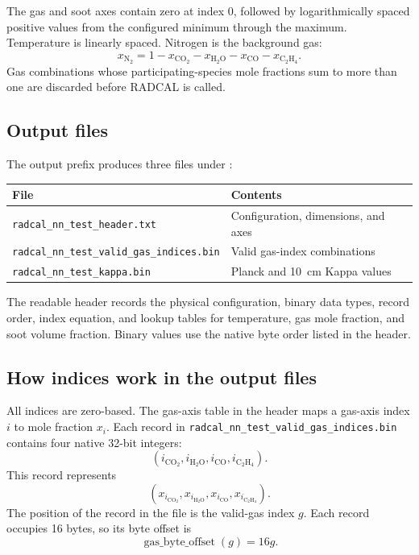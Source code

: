 \documentclass[11pt]{article}
\begin{document}
The gas and soot axes contain zero at index 0, followed by logarithmically
spaced positive values from the configured minimum through the maximum.
Temperature is linearly spaced. Nitrogen is the background gas:
\[
x_{\mathrm{N_2}} =
1-x_{\mathrm{CO_2}}-x_{\mathrm{H_2O}}-x_{\mathrm{CO}}-x_{\mathrm{C_2H_4}}.
\]
Gas combinations whose participating-species mole fractions sum to more than
one are discarded before RADCAL is called.

\subsection{Output files}

The output prefix produces three files under
:

\begin{center}
\begin{tabular}{ll}
\toprule
File & Contents \\
\midrule
\texttt{radcal\_nn\_test\_header.txt} & Configuration, dimensions, and axes \\
\texttt{radcal\_nn\_test\_valid\_gas\_indices.bin} & Valid gas-index combinations \\
\texttt{radcal\_nn\_test\_kappa.bin} & Planck and 10~cm Kappa values \\
\bottomrule
\end{tabular}
\end{center}

The readable header records the physical configuration, binary data types,
record order, index equation, and lookup tables for temperature, gas mole
fraction, and soot volume fraction. Binary values use the native byte order
listed in the header.

\subsection{How indices work in the output files}

All indices are zero-based. The gas-axis table in the header maps a gas-axis
index \(i\) to mole fraction \(x_i\). Each record in
\texttt{radcal\_nn\_test\_valid\_gas\_indices.bin} contains four native
32-bit integers:
\[
(i_{\mathrm{CO_2}},i_{\mathrm{H_2O}},i_{\mathrm{CO}},i_{\mathrm{C_2H_4}}).
\]
This record represents
\[
(x_{i_{\mathrm{CO_2}}},x_{i_{\mathrm{H_2O}}},
x_{i_{\mathrm{CO}}},x_{i_{\mathrm{C_2H_4}}}).
\]
The position of the record in the file is the valid-gas index \(g\). Each
record occupies 16 bytes, so its byte offset is
\[
\operatorname{gas\_byte\_offset}(g)=16g.
\]
\end{document}
